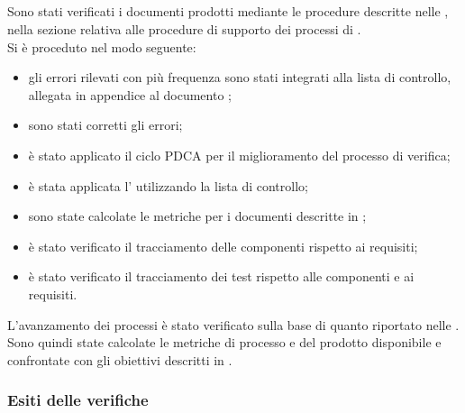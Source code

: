 \subsection{\RQ{}}
Sono stati verificati i documenti prodotti mediante le procedure descritte nelle \NormeDiProgetto{}, nella sezione relativa alle procedure di supporto dei processi di \VV{}.\\
Si è proceduto nel modo seguente:\begin{itemize}
	\item gli errori rilevati con più frequenza sono stati integrati alla lista di controllo, allegata in appendice al documento \NormeDiProgetto{};
	\item sono stati corretti gli errori;
	\item è stato applicato il ciclo PDCA per il miglioramento del processo di verifica;
	\item è stata applicata l' utilizzando la lista di controllo;
	\item sono state calcolate le metriche per i documenti descritte in \NormeDiProgetto{};
	\item è stato verificato il tracciamento delle componenti rispetto ai requisiti;
	\item è stato verificato il tracciamento dei test rispetto alle componenti e ai requisiti.
\end{itemize}
L'avanzamento dei processi è stato verificato sulla base di quanto riportato nelle \NormeDiProgetto{}. Sono quindi state calcolate le metriche di processo e del prodotto disponibile e confrontate con gli obiettivi descritti in .

\subsubsection{Esiti delle verifiche}
